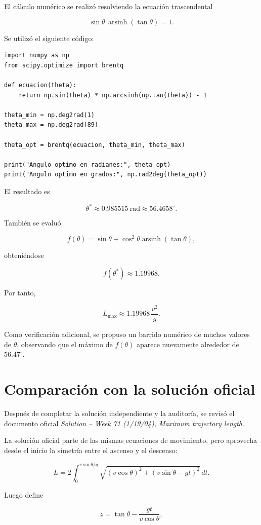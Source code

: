 El cálculo numérico se realizó resolviendo la ecuación trascendental

\[
\sin\theta\,\operatorname{arsinh}(\tan\theta)=1.
\]

Se utilizó el siguiente código:

\begin{lstlisting}
import numpy as np
from scipy.optimize import brentq

def ecuacion(theta):
    return np.sin(theta) * np.arcsinh(np.tan(theta)) - 1

theta_min = np.deg2rad(1)
theta_max = np.deg2rad(89)

theta_opt = brentq(ecuacion, theta_min, theta_max)

print("Angulo optimo en radianes:", theta_opt)
print("Angulo optimo en grados:", np.rad2deg(theta_opt))
\end{lstlisting}

El resultado es

\[
\theta^*
\approx
0.985515\ \text{rad}
\approx
56.4658^\circ.
\]

También se evaluó

\[
f(\theta)
=
\sin\theta+
\cos^2\theta\operatorname{arsinh}(\tan\theta),
\]

obteniéndose

\[
f(\theta^*)\approx1.19968.
\]

Por tanto,

\[
\boxed{
L_{\max}
\approx
1.19968\,\frac{v^2}{g}
}.
\]

Como verificación adicional, se propuso un barrido numérico de muchos valores de \(\theta\), observando que el máximo de \(f(\theta)\) aparece nuevamente alrededor de \(56.47^\circ\).

\section{Comparación con la solución oficial}

Después de completar la solución independiente y la auditoría, se revisó el documento oficial \textit{Solution -- Week 71 (1/19/04), Maximum trajectory length}.

La solución oficial parte de las mismas ecuaciones de movimiento, pero aprovecha desde el inicio la simetría entre el ascenso y el descenso:

\[
L
=
2\int_0^{v\sin\theta/g}
\sqrt{
(v\cos\theta)^2+
(v\sin\theta-gt)^2
}\,dt.
\]

Luego define

\[
z=\tan\theta-\frac{gt}{v\cos\theta},
\]

